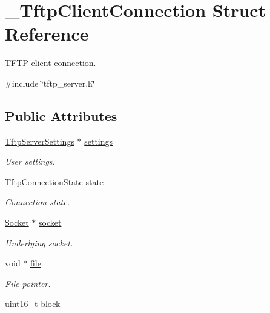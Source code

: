 \hypertarget{struct__TftpClientConnection}{}\section{\+\_\+\+Tftp\+Client\+Connection Struct Reference}
\label{struct__TftpClientConnection}


T\+F\+TP client connection.  




{\ttfamily \#include \char`\"{}tftp\+\_\+server.\+h\char`\"{}}

\subsection*{Public Attributes}
\begin{DoxyCompactItemize}
\item 
\hyperlink{structTftpServerSettings}{Tftp\+Server\+Settings} $\ast$ \hyperlink{struct__TftpClientConnection_ac24303a42c8fa65c12f0d146e72be205}{settings}
\begin{DoxyCompactList}\small\item\em User settings. \end{DoxyCompactList}\item 
\hyperlink{tftp__server_8h_ab2a2374014f9d5d77c65b15bb32f3a4a}{Tftp\+Connection\+State} \hyperlink{struct__TftpClientConnection_a18833ef8d7ab8b7443b50707b93144a0}{state}
\begin{DoxyCompactList}\small\item\em Connection state. \end{DoxyCompactList}\item 
\hyperlink{socket_8h_aa85acfb0fa336ef495e6ba87fb88fc48}{Socket} $\ast$ \hyperlink{struct__TftpClientConnection_a8f3e2f235189955f471f108e9ee39da4}{socket}
\begin{DoxyCompactList}\small\item\em Underlying socket. \end{DoxyCompactList}\item 
void $\ast$ \hyperlink{struct__TftpClientConnection_a2e93e9d3b564afe99f7905cabe37aded}{file}
\begin{DoxyCompactList}\small\item\em File pointer. \end{DoxyCompactList}\item 
\hyperlink{stdint_8h_a273cf69d639a59973b6019625df33e30}{uint16\+\_\+t} \hyperlink{struct__TftpClientConnection_a9adfdabd7901165364f3d194c3239974}{block}

\end{DoxyCompactItemize}
